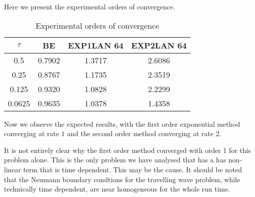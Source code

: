 Here we present the experimental orders of convergence.
\begin{table}[H]
    \centering
    \begin{tabular}{| c | c | c | c |}
    \hline
    $\tau$ & BE & EXP1LAN 64 & EXP2LAN 64 \\
    \hline
    0.5 & 0.7902 & 1.3717 & 2.6086 \\
    0.25 & 0.8767 & 1.1735 & 2.3519 \\
    0.125 & 0.9320 & 1.0828 & 2.2299\\
    0.0625 & 0.9635  & 1.0378 & 1.4358 \\
    \hline
    \end{tabular}
    \caption{Experimental orders of convergence}
    \label{tab:reduced_data}
\end{table}

Now we observe the expected results, with the first order exponential method converging at rate $1$ and the second order method converging at rate $2$.

It is not entirely clear why the first order method converged with order 1 for this problem alone.
This is the only problem we have analysed that has a has non-linear term that is time dependent.
This may be the cause.
It should be noted that the Neumann boundary condtions for the travelling wave problem, while technically time dependent, are near homogeneous for the whole run time.

